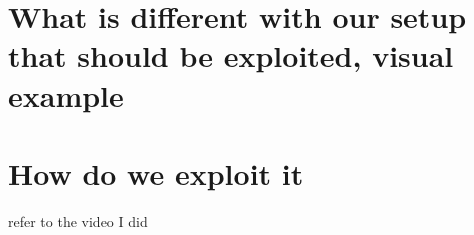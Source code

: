 \section{What is different with our setup that should be exploited, visual example}

\section{How do we exploit it}

refer to the video I did



